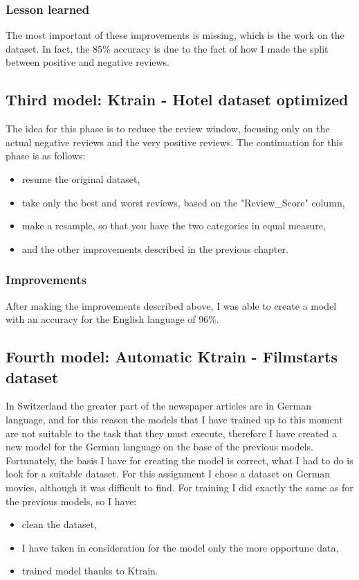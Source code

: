 \subsubsection{Lesson learned}
The most important of these improvements is missing, which is the work on the dataset.
In fact, the 85\% accuracy is due to the fact of how I made the split between positive and negative reviews.


\subsection{Third model: Ktrain - Hotel dataset optimized}
The idea for this phase is to reduce the review window, focusing only on the actual negative reviews and the very positive reviews.
The continuation for this phase is as follows:
\begin{itemize}
    \item resume the original dataset,
    \item take only the best and worst reviews, based on the "Review\_Score" column,
    \item make a resample, so that you have the two categories in equal measure,
    \item and the other improvements described in the previous chapter.
\end{itemize}

\subsubsection{Improvements}
After making the improvements described above, I was able to create a model with an accuracy for the English language of 96\%.

\subsection{Fourth model: Automatic Ktrain - Filmstarts dataset}
\label{chap:model filmstars auto}
In Switzerland the greater part of the newspaper articles are in German language, and for this reason the models that I have trained up to this moment are not suitable to the task that they must execute, therefore I have created a new model for the German language on the base of the previous models.
Fortunately, the basis I have for creating the model is correct, what I had to do is look for a suitable dataset.
For this assignment I chose a dataset on German movies, although it was difficult to find.
For training I did exactly the same as for the previous models, so I have:
\begin{itemize}
    \item clean the dataset,
    \item I have taken in consideration for the model only the more opportune data,
    \item trained model thanks to Ktrain.
\end{itemize}

